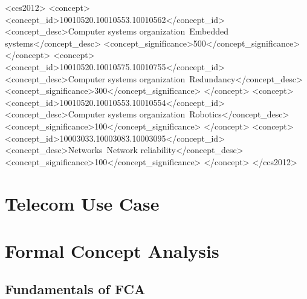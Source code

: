 \documentclass[acmconf,authordraft]{acmart}
\begin{document}
\begin{CCSXML}
<ccs2012>
 <concept>
  <concept_id>10010520.10010553.10010562</concept_id>
  <concept_desc>Computer systems organization~Embedded systems</concept_desc>
  <concept_significance>500</concept_significance>
 </concept>
 <concept>
  <concept_id>10010520.10010575.10010755</concept_id>
  <concept_desc>Computer systems organization~Redundancy</concept_desc>
  <concept_significance>300</concept_significance>
 </concept>
 <concept>
  <concept_id>10010520.10010553.10010554</concept_id>
  <concept_desc>Computer systems organization~Robotics</concept_desc>
  <concept_significance>100</concept_significance>
 </concept>
 <concept>
  <concept_id>10003033.10003083.10003095</concept_id>
  <concept_desc>Networks~Network reliability</concept_desc>
  <concept_significance>100</concept_significance>
 </concept>
</ccs2012>
\end{CCSXML}





\maketitle

\section{Telecom Use Case}

\section{Formal Concept Analysis}

\subsection{Fundamentals of FCA}
\end{document}
